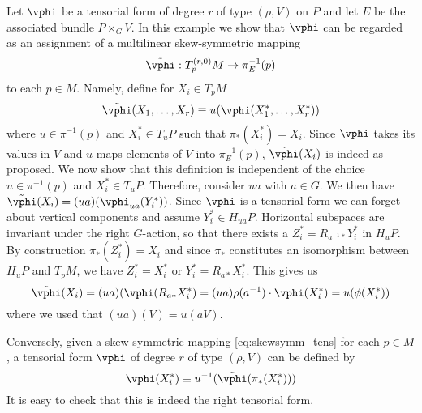 \documentclass[10pt,reqno]{amsart}
\numberwithin{equation}{section}
\begin{document}
\begin{example}\label{ex:tensorial_skewsymm}
	Let $\vphi$ be a tensorial form of degree $r$ of type 
	$(\rho,V)$ on $P$ and let $E$ be the associated bundle 
	$P\times_G V$. In this example we show that $\vphi$ can be 
	regarded as an assignment of a multilinear skew-symmetric 
	mapping
	\begin{equation}\label{eq:skewsymm_tens}
		\tilde{\vphi} : T^{(r,0)}_p M \rightarrow \pi^{-1}_E(p)
	\end{equation}
	to each $p \in M$. Namely, define for $X_i \in T_pM$
	\begin{equation}
		\tilde{\vphi}(X_1,\ldots,X_r) \equiv 
		u(\vphi(X^\ast_1,\ldots,X^\ast_r))
	\end{equation}
	where $u \in \pi^{-1}(p)$ and $X^\ast_i \in T_uP$ such that 
	$\pi_\ast(X^\ast_i) = X_i$. Since $\vphi$ takes its values in 
	$V$ and $u$ maps elements of $V$ into $\pi^{-1}_E(p)$,  
	$\tilde{\vphi}(X_i)$ is indeed as proposed. We now show that 
	this definition is independent of the choice $u \in 
	\pi^{-1}(p)$ and $X^\ast_i \in T_uP$. Therefore, consider $ua$ 
	with $a \in G$. We then have $\tilde{\vphi}(X_i) = 
	(ua)(\vphi_{ua}(Y^\ast_i))$. Since $\vphi$ is a tensorial form 
	we can forget about vertical components and assume $Y^\ast_i 
	\in H_{ua}P$. Horizontal subspaces are invariant under the 
	right $G$-action, so that there exists a $Z^\ast_i = 
	R_{a^{-1}\ast} Y^\ast_i$ in $H_uP$. By construction 
	$\pi_\ast(Z^\ast_i) = X_i$ and since $\pi_\ast$ constitutes an 
	isomorphism between $H_uP$ and $T_pM$, we have $Z^\ast_i = 
	X^\ast_i$ or $Y^\ast_i = R_{a\ast}X^\ast_i$. This gives us
	\begin{displaymath}
		\tilde{\vphi}(X_i) = (ua)(\vphi(R_{a\ast}X^\ast_i) = 
		(ua)\rho(a^{-1})\cdot\vphi(X^\ast_i) = u(\phi(X^\ast_i))
	\end{displaymath}
	where we used that $(ua)(V) = u(aV)$.

	Conversely, given a skew-symmetric mapping 
	\eqref{eq:skewsymm_tens} for each $p \in M$, a tensorial form 
	$\vphi$ of degree $r$ of type $(\rho,V)$ can be defined by
	\begin{equation}
		\vphi(X^\ast_i) \equiv 
		u^{-1}(\tilde{\vphi}(\pi_\ast(X^\ast_i)))
	\end{equation}
	It is easy to check that this is indeed the right tensorial 
	form.
\end{example}
\end{document}
